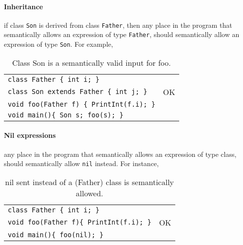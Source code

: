 \documentclass{article}
\begin{document}
\paragraph{Inheritance} if class \verb"Son" is derived from class \verb"Father",
then any place in the program that semantically allows an expression of type \verb"Father",
should semantically allow an expression of type \verb"Son".
For example,
\begin{table}[h]
\centering
\begin{tabular}{ | l  | l | }
\hline
\verb"class Father { int i; }"               &    \\
\verb"class Son extends Father { int j; }"   & OK \\
\verb"void foo(Father f) { PrintInt(f.i); }" &    \\
\verb"void main(){ Son s; foo(s); }"         &    \\
\hline
\end{tabular}
\caption{Class Son is a semantically valid input for foo.
\label{Table_Code_Examples_Son_Class_Instead_Of_Father_Class}}
\end{table}
\paragraph{Nil expressions} any place in the program that
semantically allows an expression of type class,
should semantically allow \verb"nil" instead.
For instance,
\begin{table}[h]
\centering
\begin{tabular}{ | l | l | }
\hline
\verb"class Father { int i; }"              &    \\
\verb"void foo(Father f){ PrintInt(f.i); }" & OK \\
\verb"void main(){ foo(nil); }"            &    \\
\hline
\end{tabular}
\caption{nil sent instead of a (Father) class is semantically allowed.
\label{Table_Code_Examples_nil_Instead_Of_Any_Class}}
\end{table}
\end{document}
